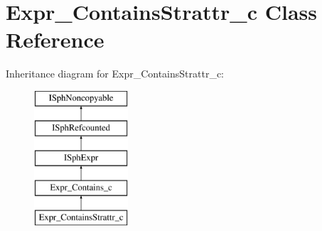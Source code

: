 \hypertarget{classExpr__ContainsStrattr__c}{\section{Expr\-\_\-\-Contains\-Strattr\-\_\-c Class Reference}
\label{classExpr__ContainsStrattr__c}
}
Inheritance diagram for Expr\-\_\-\-Contains\-Strattr\-\_\-c\-:\begin{figure}[H]
\begin{center}
\leavevmode
\includegraphics[height=5.000000cm]{classExpr__ContainsStrattr__c}
\end{center}
\end{figure}
